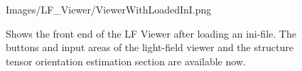 \begin{figure}[htb]
	\begin{minipage}[h]{\textwidth}
		\centering
		\begin{overpic}[width=0.7\linewidth]{Images/LF_Viewer/ViewerWithLoadedInI.png}
		\end{overpic}
	\end{minipage}
	\caption{Shows the front end of the LF Viewer after loading an ini-file. The buttons and input areas of the light-field viewer and the structure tensor orientation estimation section are available now.}
	\label{figure_LFViewer_frontend_withINI}
\end{figure}
